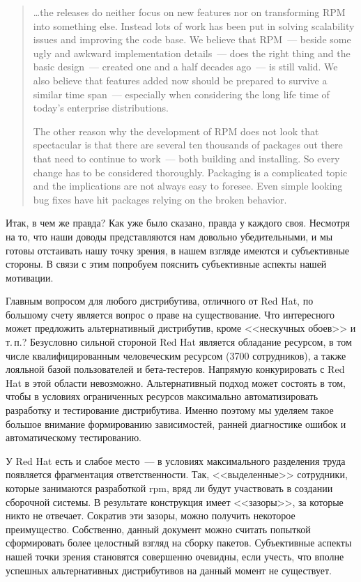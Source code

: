 \documentclass[russian,a4paper,12pt,titlepage]{article}
\begin{document}
\begin{quote}
\ldots the releases do neither focus on new features nor on transforming RPM into something else.
Instead lots of work has been put in solving scalability issues and improving the code base. We believe that RPM~---
beside some ugly and awkward implementation details~--- does the right thing and the basic design~---
created one and a half decades ago~--- is still valid. We also believe that features added now should be prepared
to survive a similar time span~--- especially when considering the long life time of today's enterprise distributions.

The other reason why the development of RPM does not look that spectacular is that there are several ten thousands
of packages out there that need to continue to work~--- both building and installing. So every change has to be
considered thoroughly. Packaging is a complicated topic and the implications are not always easy to foresee.
Even simple looking bug fixes have hit packages relying on the broken behavior.
\end{quote}

Итак, в чем же правда?  Как уже было сказано, правда у каждого своя.  Несмотря на то, что наши доводы представляются
нам довольно убедительными, и мы готовы отстаивать нашу точку зрения, в нашем взгляде имеются и субъективные стороны.
В связи с этим попробуем пояснить субъективные аспекты нашей мотивации.

Главным вопросом для любого дистрибутива, отличного от Red Hat, по большому счету является вопрос о праве на существование.
Что интересного может предложить альтернативный дистрибутив, кроме <<нескучных обоев>> и т.\,п.?  Безусловно сильной стороной
Red Hat является обладание ресурсом, в том числе квалифицированным человеческим ресурсом (3700 сотрудников), а также лояльной
базой пользователей и бета-тестеров.  Напрямую конкурировать с Red Hat в этой области невозможно.  Альтернативный
подход может состоять в том, чтобы в условиях ограниченных ресурсов максимально автоматизировать разработку и тестирование
дистрибутива.  Именно поэтому мы уделяем такое большое внимание формированию зависимостей, ранней диагностике ошибок
и автоматическому тестированию.

У Red Hat есть и слабое место~--- в условиях максимального разделения труда появляется фрагментация ответственности.
Так, <<выделенные>> сотрудники, которые занимаются разработкой rpm, вряд ли будут участвовать в создании сборочной
системы.  В результате конструкция имеет <<зазоры>>, за которые никто не отвечает.  Сократив эти зазоры, можно получить некоторое
преимущество.  Собственно, данный документ можно считать попыткой сформировать более целостный взгляд на сборку пакетов.
Субъективные аспекты нашей точки зрения становятся совершенно очевидны, если учесть, что вполне успешных альтернативных
дистрибутивов на данный момент не существует.
\end{document}
